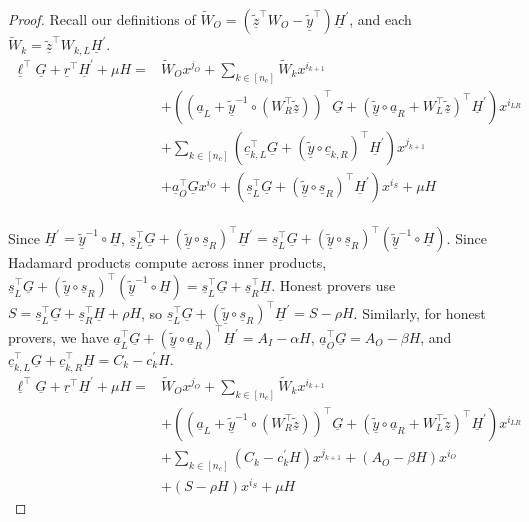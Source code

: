 \documentclass{article}
\theoremstyle{definition}
\newcommand{\zq}{\widetilde{\underline{z}}}
\newcommand{\yq}{\widetilde{\underline{y}}}
\begin{document}
\begin{proof}
Recall our definitions of $\widetilde{W}_O=\left(\zq^\top W_O - \yq^\top\right)\underline{H}^\prime$, and each $\widetilde{W}_{k} = \zq^\top W_{k,L} \underline{H}^\prime$.
\begin{align*}
\underline{\ell}^\top \underline{G} + \underline{r}^\top \underline{H}^\prime + \mu H =& \widetilde{W}_O x^{j_O} + \sum_{k \in [n_c]} \widetilde{W}_k x^{i_{k+1}} \\
& + \left(\left(\underline{a}_L + \yq^{-1} \circ(W_R^\top\zq)\right)^\top \underline{G} + \left(\yq \circ \underline{a}_R + W_L^\top \zq\right)^\top \underline{H}^\prime\right)x^{i_{LR}} \\
&+ \sum_{k \in [n_c]} \left(\underline{c}_{k,L}^\top \underline{G} + \left(\yq \circ \underline{c}_{k,R}\right)^\top \underline{H}^\prime\right)x^{j_{k+1}} \\
& + \underline{a}_O^\top \underline{G} x^{i_O} + (\underline{s}_L^\top \underline{G} + (\yq \circ \underline{s}_R)^\top \underline{H}^\prime) x^{i_S} + \mu H \\
\end{align*}




Since $\underline{H}^\prime = \yq^{-1} \circ \underline{H}$,  $\underline{s}^\top_L \underline{G} + (\yq \circ \underline{s}_R)^\top \underline{H}^\prime = \underline{s}^\top_L \underline{G} + (\yq \circ \underline{s}_R)^\top (\yq^{-1} \circ \underline{H})$. Since Hadamard products compute across inner products, $\underline{s}^\top_L \underline{G} + (\yq \circ \underline{s}_R)^\top (\yq^{-1} \circ \underline{H}) = \underline{s}^\top_L \underline{G} + \underline{s}_R^\top \underline{H}$. Honest provers use $S = \underline{s}_L^\top \underline{G} + \underline{s}_R^\top \underline{H} + \rho H$, so $\underline{s}^\top_L\underline{G} + (\yq \circ \underline{s}_R)^\top \underline{H}^\prime = S -\rho H$. Similarly, for honest provers, we have $\underline{a}^\top_L\underline{G} + (\yq \circ \underline{a}_R)^\top \underline{H}^\prime = A_I - \alpha H$, $\underline{a}^\top_O\underline{G} = A_O - \beta H$, and $\underline{c}_{k,L}^\top \underline{G} + \underline{c}_{k,R}^\top \underline{H} = C_k - c_k^\prime H$. 
\begin{align*}
\underline{\ell}^\top \underline{G} + \underline{r}^\top \underline{H}^\prime + \mu H =& \widetilde{W}_O x^{j_O} + \sum_{k \in [n_c]} \widetilde{W}_k x^{i_{k+1}} \\
& + \left(\left(\underline{a}_L + \yq^{-1} \circ(W_R^\top\zq)\right)^\top \underline{G} + \left(\yq \circ \underline{a}_R + W_L^\top \zq\right)^\top \underline{H}^\prime\right)x^{i_{LR}} \\
&+ \sum_{k \in [n_c]} \left(C_k - c_k^\prime H\right)x^{j_{k+1}} + (A_O - \beta H) x^{i_O} \\
&  + (S - \rho H) x^{i_S} + \mu H 
\end{align*}


\end{proof}
\end{document}
